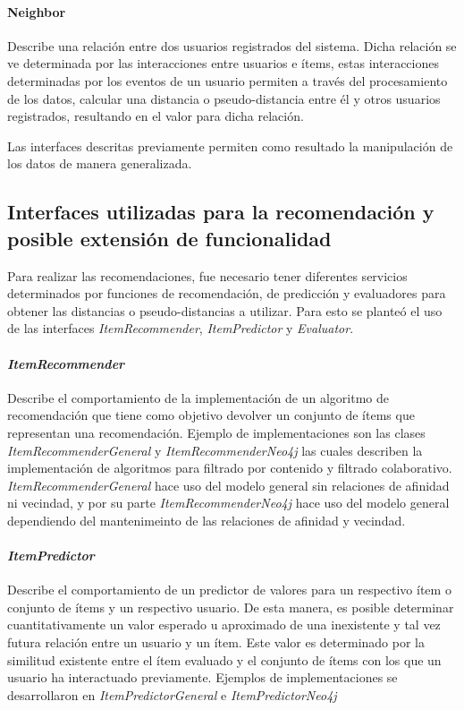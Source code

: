 \paragraph{Neighbor}
Describe una relación entre dos usuarios registrados del sistema. Dicha relación se ve determinada por las interacciones entre usuarios e ítems, estas interacciones determinadas por los eventos de un usuario permiten a través del procesamiento de los datos, calcular una distancia o pseudo-distancia entre él y otros usuarios registrados, resultando en el valor para dicha relación. 

Las interfaces descritas previamente permiten como resultado la manipulación de los datos de manera generalizada. 

\subsection{Interfaces utilizadas para la recomendación y posible extensión de funcionalidad}
Para realizar las recomendaciones, fue necesario tener diferentes servicios determinados por funciones de recomendación, de predicción y evaluadores para obtener las distancias o pseudo-distancias a utilizar. Para esto se planteó el uso de las interfaces \emph{ItemRecommender}, \emph{ItemPredictor} y \emph{Evaluator}.

\paragraph{\emph{ItemRecommender}}
Describe el comportamiento de la implementación de un algoritmo de recomendación que tiene como objetivo devolver un conjunto de ítems que representan una recomendación. Ejemplo de implementaciones son las clases \emph{ItemRecommenderGeneral} y \emph{ItemRecommenderNeo4j} las cuales describen la implementación de algoritmos para filtrado por contenido y filtrado colaborativo. \emph{ItemRecommenderGeneral} hace uso del modelo general sin relaciones de afinidad ni vecindad, y por su parte \emph{ItemRecommenderNeo4j} hace uso del modelo general dependiendo del mantenimeinto de las relaciones de afinidad y vecindad. 

\paragraph{\emph{ItemPredictor}}
Describe el comportamiento de un predictor de valores para un respectivo ítem o conjunto de ítems y un respectivo usuario. De esta manera, es posible determinar cuantitativamente un valor esperado u aproximado de una inexistente y tal vez futura relación entre un usuario y un ítem. Este valor es determinado por la similitud existente entre el ítem evaluado y el conjunto de ítems con los que un usuario ha interactuado previamente. Ejemplos de implementaciones se desarrollaron en \emph{ItemPredictorGeneral} e \emph{ItemPredictorNeo4j} 

